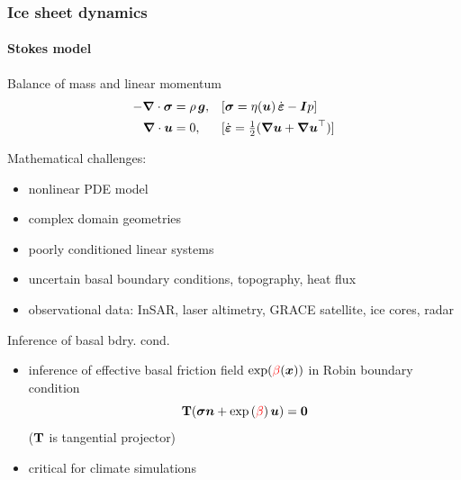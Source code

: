 \documentclass[10pt,final,xcolor=dvipsnames,aspect ratio=169]{beamer}
\begin{document}
\begin{frame}
	\frametitle{Ice sheet dynamics}
	\framesubtitle{Stokes model}	
	\begin{block}{Balance of mass and linear momentum}
		\[
		\begin{aligned}
		- \gbf{\nabla} \cdot \gbf{\sigma}
		&= \rho\, \gbf{g},
		&&[
		\gbf{\sigma}=\eta(\gbf{u}) \, \edot - \gbf{I}p]
		\hspace{-2em}
		\\
		\gbf{\nabla} \cdot \gbf{u} &= 0, &&[\edot =\tfrac 12 (\gbf{\nabla u}+\gbf{\nabla u}^{\top})]		
		\end{aligned}
		\]
	\end{block}
	\vspace{0.2cm}
	\begin{minipage}{.49\columnwidth}
		\alert{Mathematical challenges:}
		\begin{itemize}
			\small
			\item nonlinear PDE model
			\item complex domain geometries
			\item poorly conditioned linear systems
			\item uncertain \alert{basal boundary conditions}, topography,
			heat flux
			\item observational data: InSAR, laser altimetry, GRACE
			satellite, ice cores, radar
		\end{itemize}
	\end{minipage}
	\begin{minipage}{.48\columnwidth}
		\alert{Inference of basal bdry. cond.}
		\begin{itemize}
			\small
			\item[] inference of effective basal friction field $\exp(\textcolor{red}{{\beta}}({\boldsymbol{x}}))$ in
			Robin boundary condition
			\begin{equation*}
			{\bf T}(\boldsymbol{\sigma} {\boldsymbol{n}} + \exp\left(\textcolor{red}{{\beta}}\right){\boldsymbol{u}}) = \boldsymbol{0}
			\end{equation*}
			($\bf T$ is tangential projector)
			\item critical for climate simulations %
		\end{itemize}
	\end{minipage}
\end{frame}
\end{document}
